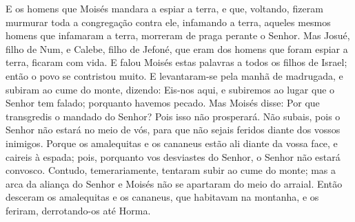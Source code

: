 E os homens que Moisés mandara a espiar a terra, e que, voltando,
fizeram murmurar toda a congregação contra ele, infamando a terra,
aqueles mesmos homens que infamaram a terra, morreram de
praga perante o Senhor. Mas Josué, filho de Num, e Calebe,
filho de Jefoné, que eram dos homens que foram espiar a terra,
ficaram com vida. E falou Moisés estas palavras a todos os
filhos de Israel; então o povo se contristou muito. E
levantaram-se pela manhã de madrugada, e subiram ao cume do monte,
dizendo: Eis-nos aqui, e subiremos ao lugar que o Senhor tem falado;
porquanto havemos pecado. Mas Moisés disse: Por que
transgredis o mandado do Senhor? Pois isso não prosperará.
Não subais, pois o Senhor não estará no meio de vós, para que
não sejais feridos diante dos vossos inimigos. Porque os
amalequitas e os cananeus estão ali diante da vossa face, e caireis
à espada; pois, porquanto vos desviastes do Senhor, o Senhor não
estará convosco. Contudo, temerariamente, tentaram subir ao
cume do monte; mas a arca da aliança do Senhor e Moisés não se
apartaram do meio do arraial. Então desceram os amalequitas e
os cananeus, que habitavam na montanha, e os feriram, derrotando-os
até Horma.

\medskip

